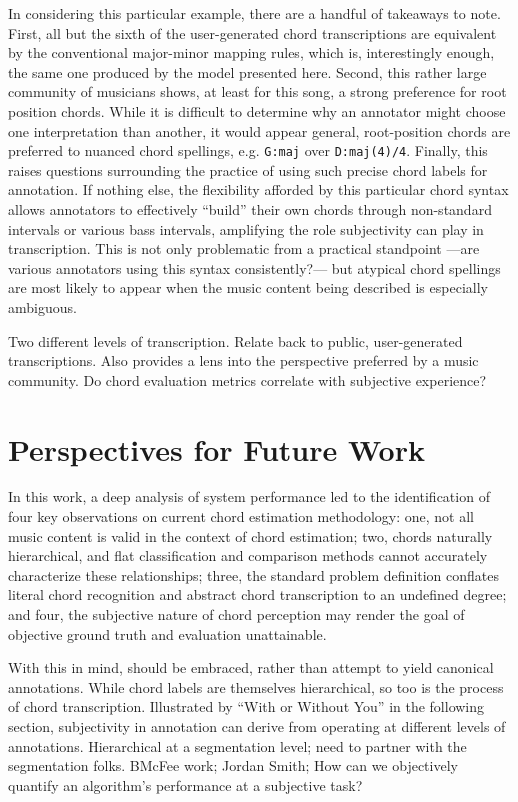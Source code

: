 \documentclass{article}
\begin{document}
In considering this particular example, there are a handful of takeaways to note.
First, all but the sixth of the user-generated chord transcriptions are equivalent by the conventional major-minor mapping rules, which is, interestingly enough, the same one produced by the model presented here.
Second, this rather large community of musicians shows, at least for this song, a strong preference for root position chords.
While it is difficult to determine why an annotator might choose one interpretation than another, it would appear general, root-position chords are preferred to nuanced chord spellings, e.g. \texttt{G:maj} over \texttt{D:maj(4)/4}.
Finally, this raises questions surrounding the practice of using such precise chord labels for annotation.
If nothing else, the flexibility afforded by this particular chord syntax allows annotators to effectively ``build'' their own chords through non-standard intervals or various bass intervals, amplifying the role subjectivity can play in transcription.
This is not only problematic from a practical standpoint ---are various annotators using this syntax consistently?--- but atypical chord spellings are most likely to appear when the music content being described is especially ambiguous.

Two different levels of transcription.
Relate back to public, user-generated transcriptions.
Also provides a lens into the perspective preferred by a music community.
Do chord evaluation metrics correlate with subjective experience?


\section{Perspectives for Future Work}

In this work, a deep analysis of system performance led to the identification of four key observations on current chord estimation methodology:
one, not all music content is valid in the context of chord estimation;
two, chords naturally hierarchical, and flat classification and comparison methods cannot accurately characterize these relationships;
three, the standard problem definition conflates literal chord recognition and abstract chord transcription to an undefined degree;
and four, the subjective nature of chord perception may render the goal of objective ground truth and evaluation unattainable.

With this in mind,
should be embraced, rather than attempt to yield canonical annotations.
While chord labels are themselves hierarchical, so too is the process of chord transcription.
Illustrated by ``With or Without You'' in the following section, subjectivity in annotation can derive from operating at different levels of annotations.
Hierarchical at a segmentation level; need to partner with the segmentation folks.
BMcFee work; Jordan Smith;
How can we objectively quantify an algorithm's performance at a subjective task?



\end{document}
